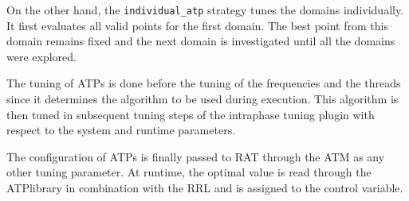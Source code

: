 On the other hand, the \texttt{individual\_atp} strategy tunes the domains individually. It first evaluates all valid points for the first domain. The best point from this domain remains fixed and the next domain is investigated until all the domains were explored.  

The tuning of ATPs is done before the tuning of the frequencies and the threads since it determines the algorithm to be used during execution. This algorithm is then tuned in subsequent tuning steps of the intraphase tuning plugin with respect to the system and runtime parameters. 

The configuration of ATPs is finally passed to RAT through the ATM as any other tuning parameter. At runtime, the optimal value is read through the ATPlibrary in combination with the RRL and is assigned to the control variable.
